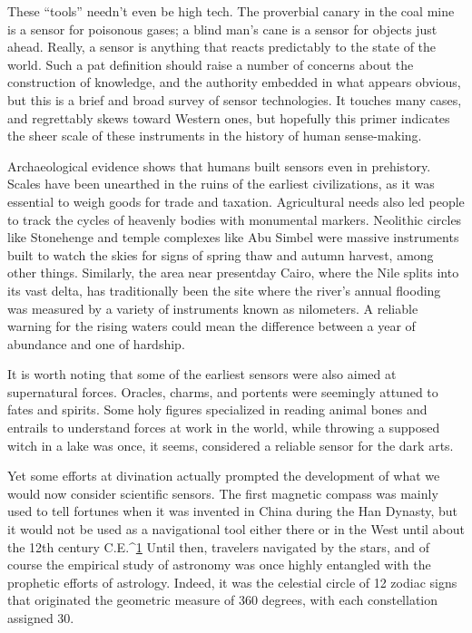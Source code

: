 These ``tools'' needn't even be high tech. The proverbial canary in the coal
mine is a sensor for poisonous gases; a blind man's cane is a sensor for
objects just ahead. Really, a sensor is anything that reacts predictably to the
state of the world. Such a pat definition should raise a number of concerns
about the construction of knowledge, and the authority embedded in what
appears obvious, but this is a brief and broad survey of sensor technologies.
It touches many cases, and regrettably skews toward Western ones,
but hopefully this primer indicates the sheer scale of these instruments in
the history of human sense-making.

Archaeological evidence shows that humans built sensors even in prehistory.
Scales have been unearthed in the ruins of the earliest civilizations, as it
was essential to weigh goods for trade and taxation. Agricultural needs also
led people to track the cycles of heavenly bodies with monumental markers.
Neolithic circles like Stonehenge and temple complexes like Abu Simbel
were massive instruments built to watch the skies for signs of spring thaw
and autumn harvest, among other things. Similarly, the area near presentday
Cairo, where the Nile splits into its vast delta, has traditionally been the site where the river's annual flooding was measured by a variety of instruments
known as nilometers. A reliable warning for the rising waters could
mean the difference between a year of abundance and one of hardship.

It is worth noting that some of the earliest sensors were also aimed at supernatural
forces. Oracles, charms, and portents were seemingly attuned to
fates and spirits. Some holy figures specialized in reading animal bones and
entrails to understand forces at work in the world, while throwing a supposed
witch in a lake was once, it seems, considered a reliable sensor for
the dark arts.

Yet some efforts at divination actually prompted the development of what
we would now consider scientific sensors. The first magnetic compass was
mainly used to tell fortunes when it was invented in China during the Han
Dynasty, but it would not be used as a navigational tool either there or in the
West until about the 12th century C.E.^{\href{#endnotes-sensors-and-sensibilia}{1}} Until then, travelers navigated by
the stars, and of course the empirical study of astronomy was once highly
entangled with the prophetic efforts of astrology. Indeed, it was the celestial
circle of 12 zodiac signs that originated the geometric measure of 360
degrees, with each constellation assigned 30.

